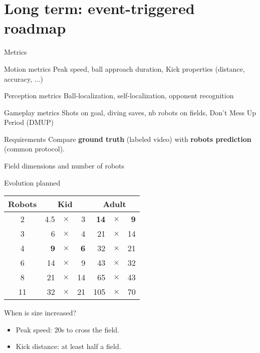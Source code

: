 \documentclass[xcolor=dvipsnames]{beamer}
\begin{document}
\section{Long term: event-triggered roadmap}

\begin{frame}{Metrics}
  \begin{block}{Motion metrics}
    Peak speed, ball approach duration, Kick properties (distance, accuracy, ...)
  \end{block}
  \begin{block}{Perception metrics}
    Ball-localization, self-localization, opponent recognition
  \end{block}
  \begin{block}{Gameplay metrics}
    Shots on goal, diving saves, nb robots on fields, Don't Mess Up Period (DMUP)
  \end{block}
  \begin{block}{Requirements}
  Compare \textbf{ground truth} (labeled video) with \textbf{robots
    prediction} (common protocol).
  \end{block}
\end{frame}

\begin{frame}{Field dimensions and number of robots}
  \begin{block}{Evolution planned}
    \centering
    \begin{tabular}{c|r c r|r c r}
      \textbf{Robots} & \multicolumn{3}{c}{\textbf{Kid}} & \multicolumn{3}{c}{\textbf{Adult}}\\
      \hline
      2 & 4.5 & $\times$ & 3 & \textbf{14} & $\times$ & \textbf{9}\\
      3 & 6 & $\times$ & 4 & 21 & $\times$ & 14\\   
      4 & \textbf{9} & $\times$ & \textbf{6} & 32 & $\times$ & 21\\
      6 & 14 & $\times$ & 9 & 43 & $\times$ & 32\\
      8 & 21 & $\times$ & 14 & 65 & $\times$ & 43\\
      11 & 32 & $\times$ & 21 & 105 & $\times$ & 70
    \end{tabular}
  \end{block}
  \begin{block}{When is size increased?}
    \begin{itemize}
    \item Peak speed: 20s to cross the field.
    \item Kick distance: at least half a field.
    \end{itemize}
  \end{block}
\end{frame}
\end{document}
